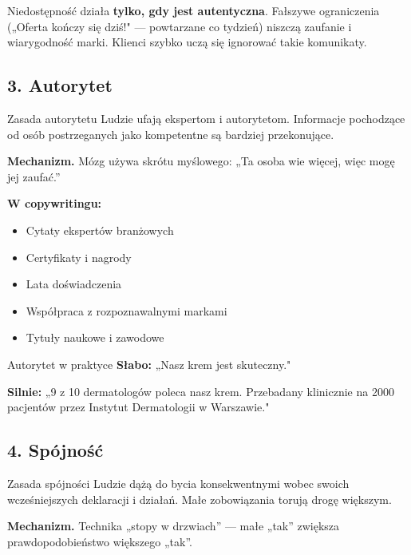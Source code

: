 \documentclass[
  12pt,
  a4paper,
  twoside,
  openright,
  12pt,
  DIV=12,
  BCOR=12mm]{scrbook}
\providecommand{\tightlist}{%
  \setlength{\itemsep}{0pt}\setlength{\parskip}{0pt}}\usepackage{longtable,booktabs,array}
\begin{document}
\begin{uwaga}
Niedostępność działa \textbf{tylko, gdy jest autentyczna}. Fałszywe ograniczenia („Oferta kończy się dziś!" --- powtarzane co tydzień) niszczą zaufanie i wiarygodność marki. Klienci szybko uczą się ignorować takie komunikaty.
\end{uwaga}

\subsection{3. Autorytet}\label{autorytet}

\begin{pojecie}{Zasada autorytetu}
Ludzie ufają ekspertom i autorytetom. Informacje pochodzące od osób postrzeganych jako kompetentne są bardziej przekonujące.
\end{pojecie}

\textbf{Mechanizm.} Mózg używa skrótu myślowego: „Ta osoba wie więcej,
więc mogę jej zaufać.''

\textbf{W copywritingu:}

\begin{itemize}
\tightlist
\item
  Cytaty ekspertów branżowych
\item
  Certyfikaty i nagrody
\item
  Lata doświadczenia
\item
  Współpraca z rozpoznawalnymi markami
\item
  Tytuły naukowe i zawodowe
\end{itemize}

\begin{przyklad}{Autorytet w praktyce}
\textbf{Słabo:} „Nasz krem jest skuteczny."

\textbf{Silnie:} „9 z 10 dermatologów poleca nasz krem. Przebadany klinicznie na 2000 pacjentów przez Instytut Dermatologii w Warszawie."
\end{przyklad}

\subsection{4. Spójność}\label{spuxf3jnoux15bux107}

\begin{pojecie}{Zasada spójności}
Ludzie dążą do bycia konsekwentnymi wobec swoich wcześniejszych deklaracji i działań. Małe zobowiązania torują drogę większym.
\end{pojecie}

\textbf{Mechanizm.} Technika „stopy w drzwiach'' --- małe „tak''
zwiększa prawdopodobieństwo większego „tak''.
\end{document}
